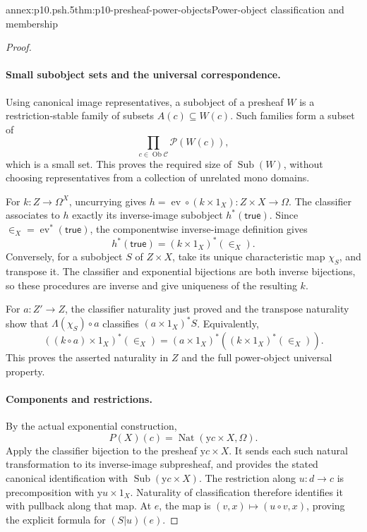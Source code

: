 \begin{annexitem}{annex:p10.psh.5}{thm:p10-presheaf-power-objects}{Power-object classification and membership}
\begin{proof}
\paragraph{Small subobject sets and the universal correspondence.}
Using canonical image representatives, a subobject of a
presheaf \(W\) is a restriction-stable family of subsets
\(A(c)\subseteq W(c)\).  Such families form a subset of
\[
                    \prod_{c\in\operatorname{Ob}\mathcal C}
                                   \mathcal P(W(c)),
\]
which is a small set.  This proves the required size of
\(\operatorname{Sub}(W)\), without choosing representatives
from a collection of unrelated mono domains.

For \(k:Z\to\Omega^X\), uncurrying gives
\(h=\operatorname{ev}\circ(k\times1_X):Z\times X\to\Omega\).
The classifier associates to \(h\) exactly its inverse-image
subobject \(h^*(\mathsf{true})\).
Since \(\in_X=\operatorname{ev}^*(\mathsf{true})\), the
componentwise inverse-image definition gives
\[
                  h^*(\mathsf{true})=(k\times1_X)^*(\in_X).
\]
Conversely, for a subobject \(S\) of \(Z\times X\), take its
unique characteristic map \(\chi_S\), and transpose it.
The classifier and exponential bijections are both inverse
bijections, so these procedures are inverse and give
uniqueness of the resulting \(k\).

For \(a:Z'\to Z\), the classifier naturality just proved and
the transpose naturality show that \(\Lambda(\chi_S)\circ a\)
classifies \((a\times1_X)^*S\).
Equivalently,
\[
 ((k\circ a)\times1_X)^*(\in_X)
                =(a\times1_X)^*((k\times1_X)^*(\in_X)).
\]
This proves the asserted naturality in \(Z\) and the full
power-object universal property.

\paragraph{Components and restrictions.}
By the actual exponential construction,
\[
             P(X)(c)=\operatorname{Nat}(\mathrm y c\times X,\Omega).
\]
Apply the classifier bijection to the presheaf
\(\mathrm y c\times X\).  It sends each such natural
transformation to its inverse-image subpresheaf, and
provides the stated canonical identification with
\(\operatorname{Sub}(\mathrm y c\times X)\).
The restriction along \(u:d\to c\) is precomposition
with \(\mathrm y u\times1_X\).  Naturality of classification
therefore identifies it with pullback along that map.
At \(e\), the map is
\((v,x)\mapsto(u\circ v,x)\), proving the explicit formula
for \((S|u)(e)\).


\end{proof}
\end{annexitem}
